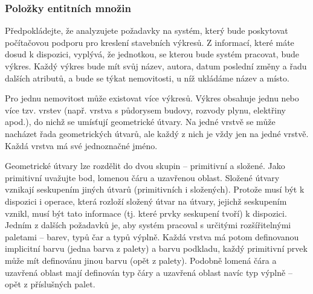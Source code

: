 \documentclass{beamer}
\begin{document}
  \begin{frame}
    \frametitle{Položky entitních množin}
    \scriptsize{
    \hspace{0.5cm}Předpokládejte, že analyzujete požadavky na systém, který bude poskytovat počítačovou
    podporu pro kreslení stavebních výkresů. Z informací, které máte dosud k dispozici,
    vyplývá, že jednotkou, se kterou bude systém pracovat, bude \colorbox{blue!30}{výkres}. Každý výkres bude
    mít svůj \colorbox{red!30}{název, autora, datum poslední změny} a řadu dalších atributů, a bude se týkat
    \colorbox{blue!30}{nemovitosti}, u níž ukládáme \colorbox{red!30}{název a místo}.\par


    \hspace{0.5cm}Pro jednu nemovitost může existovat více výkresů. Výkres obsahuje jednu nebo více tzv.
    \colorbox{blue!30}{vrstev} (např. vrstva s půdorysem budovy, rozvody plynu, elektřiny apod.), do nichž se
    umísťují geometrické útvary. Na jedné vrstvě se může nacházet řada \colorbox{blue!30}{geometrických útvarů},
    ale každý z nich je vždy jen na jedné vrstvě. Každá vrstva má své \colorbox{red!30}{jednoznačné jméno}.\par


    \hspace{0.5cm}Geometrické útvary lze rozdělit do dvou skupin -- \colorbox{blue!30}{primitivní} a \colorbox{blue!30}{složené}. Jako primitivní
    uvažujte bod, lomenou čáru a uzavřenou oblast. Složené útvary vznikají seskupením jiných
    útvarů (primitivních i složených). Protože musí být k dispozici i operace, která rozloží
    složený útvar na útvary, jejichž seskupením vznikl, musí být tato informace (tj. které
    prvky seskupení tvoří) k dispozici. Jedním z dalších požadavků je, aby systém pracoval
    s určitými rozšířitelnými \colorbox{blue!30}{paletami} -- barev, typů čar a typů výplně. Každá vrstva má
    potom definovanou \colorbox{red!30}{implicitní barvu} (jedna barva  z  palety) a barvu podkladu, každý
    primitivní prvek může mít definovánu jinou barvu (opět z palety). Podobně lomená čára
    a uzavřená oblast mají definován typ čáry a uzavřená oblast navíc typ výplně – opět
    z příslušných palet.\par}
  \end{frame}
\end{document}
